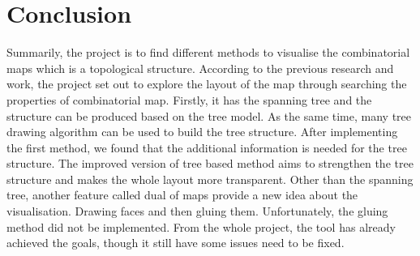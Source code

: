 \chapter{Conclusion}
Summarily, the project is to find different methods to visualise the combinatorial maps which is a topological structure. According to the previous research and work, the project set out to explore the layout of the map through searching the properties of combinatorial map. Firstly, it has the spanning tree and the structure can be produced based on the tree model. As the same time, many tree drawing algorithm can be used to build the tree structure. After implementing the first method, we found that the additional information is needed for the tree structure. The improved version of tree based method aims to strengthen the tree structure and makes the whole layout more transparent. Other than the spanning tree, another feature called dual of maps provide a new idea about the visualisation. Drawing faces and then gluing them. Unfortunately, the gluing method did not be implemented. From the whole project, the tool has already achieved the goals, though it still have some issues need to be fixed.
